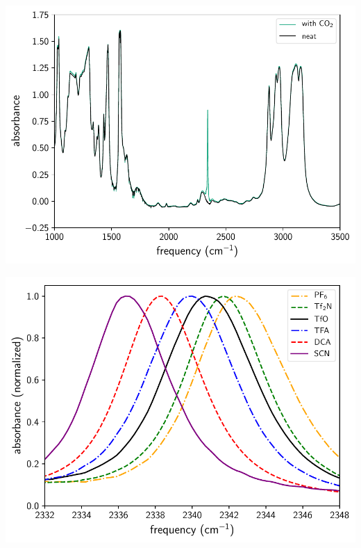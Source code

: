 \documentclass{beamer}
\begin{document}
\begin{frame}
  \centering
  \includegraphics[scale=0.70]{./figures/experimental_spectra_TfO.pdf}
\end{frame}

\begin{frame}
  \centering
  \includegraphics[scale=0.70]{./figures/experimental_spectra_shifting.pdf}
\end{frame}
\end{document}
